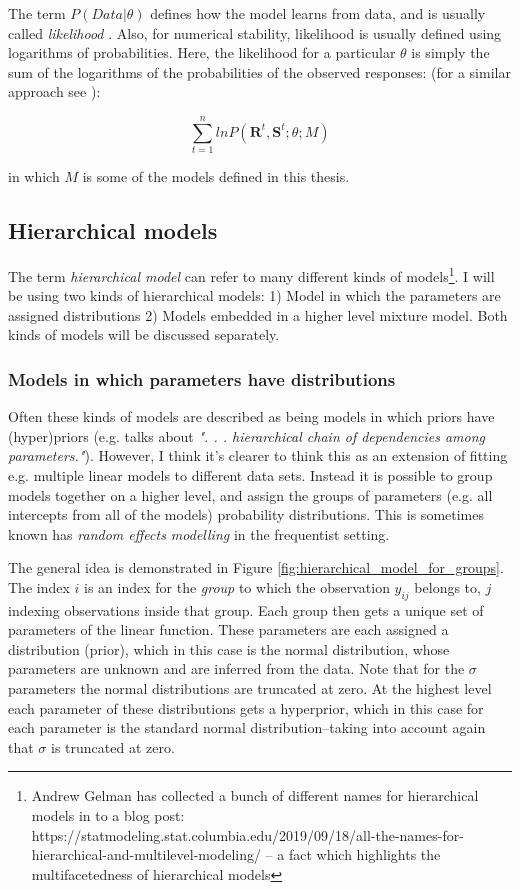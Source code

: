 \documentclass{article}\usepackage{knitr}
\begin{document}
The term $P(Data | \theta)$ defines how the model learns from data, and is usually called \textit{likelihood} \citep{kruschke2015}. Also, for numerical stability, likelihood is usually defined using logarithms of probabilities. Here, the likelihood for a particular $\theta$ is simply the sum of the logarithms of the probabilities of the observed responses: (for a similar approach see \citet[p. 218]{wickens1992}):

\begin{equation}
\sum_{t=1}^n ln P(\bm{R}^t, \bm{S}^t; \theta; M)
\end{equation}

in which $M$ is some of the models defined in this thesis. 

\subsection{Hierarchical models}
\label{sec:hierarchical_models}

The term \textit{hierarchical model} can refer to many different kinds of models\footnote{Andrew Gelman has collected a bunch of different names for hierarchical models in to a blog post: https://statmodeling.stat.columbia.edu/2019/09/18/all-the-names-for-hierarchical-and-multilevel-modeling/ -- a fact which highlights the multifacetedness of hierarchical models}. I will be using two kinds of hierarchical models: 1) Model in which the parameters are assigned distributions 2) Models embedded in a higher level mixture model. Both kinds of models will be discussed separately.

\subsubsection*{Models in which parameters have distributions}

Often these kinds of models are described as being models in which priors have (hyper)priors (e.g. \citet[p. 225]{kruschke2015} talks about \textit{". . . hierarchical chain of dependencies among parameters."}). However, I think it's clearer to think this as an extension of fitting e.g. multiple linear models to different data sets. Instead it is possible to group models together on a higher level, and assign the groups of parameters (e.g. all intercepts from all of the models) probability distributions. This is sometimes known has \textit{random effects modelling} in the frequentist setting.

The general idea is demonstrated in Figure \ref{fig:hierarchical_model_for_groups}. The index $i$ is an index for the \textit{group} to which the observation $y_{ij}$ belongs to, $j$ indexing observations inside that group. Each group then gets a unique set of parameters of the linear function. These parameters are each assigned a distribution (prior), which in this case is the normal distribution, whose parameters are unknown and are inferred from the data. Note that for the $\sigma$ parameters the normal distributions are truncated at zero. At the highest level each parameter of these distributions gets a hyperprior, which in this case for each parameter is the standard normal distribution--taking into account again that $\sigma$ is truncated at zero.
\end{document}
